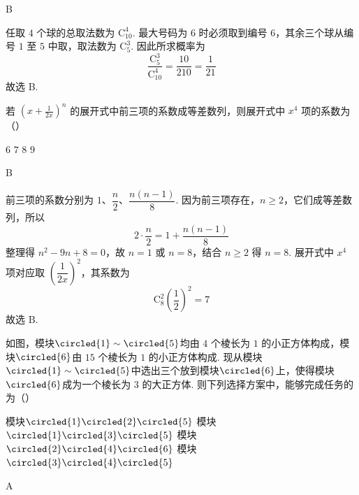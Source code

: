 \begin{answer}
B
\end{answer}

\begin{solution}
任取 \(4\) 个球的总取法数为 \(\mathrm C_{10}^{4}\). 最大号码为 \(6\) 时必须取到编号 \(6\)，其余三个球从编号 \(1\) 至 \(5\) 中取，取法数为 \(\mathrm C_{5}^{3}\). 因此所求概率为
\[
\frac{\mathrm C_{5}^{3}}{\mathrm C_{10}^{4}}=\frac{10}{210}=\frac{1}{21}
\]
故选 B.
\end{solution}

\begin{problem}
若 \( \left(x+\frac{1}{2x}\right)^{n} \) 的展开式中前三项的系数成等差数列，则展开式中 \( x^{4} \) 项的系数为（\quad）

\choices
    {\(6\)}
    {\(7\)}
    {\(8\)}
    {\(9\)}
\end{problem}

\begin{answer}
B
\end{answer}

\begin{solution}
前三项的系数分别为 \(1\)、\(\dfrac{n}{2}\)、\(\dfrac{n(n-1)}{8}\). 因为前三项存在，\(n\geqslant2\)，它们成等差数列，所以
\[
2\cdot\frac{n}{2}=1+\frac{n(n-1)}{8}
\]
整理得 \(n^{2}-9n+8=0\)，故 \(n=1\) 或 \(n=8\)，结合 \(n\geqslant2\) 得 \(n=8\). 展开式中 \(x^{4}\) 项对应取 \(\left(\dfrac{1}{2x}\right)^{2}\)，其系数为
\[
\mathrm C_{8}^{2}\left(\frac{1}{2}\right)^{2}=7
\]
故选 B.
\end{solution}

\begin{problem}
如图，模块\(\circled{1}\sim\circled{5}\)均由 \(4\) 个棱长为 \(1\) 的小正方体构成，模块\(\circled{6}\)由 \(15\) 个棱长为 \(1\) 的小正方体构成. 现从模块\(\circled{1}\sim\circled{5}\)中选出三个放到模块\(\circled{6}\)上，使得模块\(\circled{6}\)成为一个棱长为 \(3\) 的大正方体. 则下列选择方案中，能够完成任务的为（\quad）


\choices
    {模块\(\circled{1}\circled{2}\circled{5}\)}
    {模块\(\circled{1}\circled{3}\circled{5}\)}
    {模块\(\circled{2}\circled{4}\circled{6}\)}
    {模块\(\circled{3}\circled{4}\circled{5}\)}
\end{problem}

\begin{answer}
A
\end{answer}

